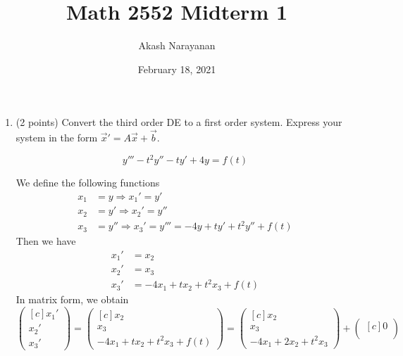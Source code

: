\documentclass[11pt, titlepage]{article}
\title{Math 2552 Midterm 1}
\author{Akash Narayanan}
\date{February 18, 2021}
\begin{document}
  \maketitle

  \begin{enumerate}
    \item (2 points) Convert the third order DE to a first order system.
    Express your system in the form \(\vec{x}' = A \vec{x} + \vec{b}\).

    \begin{equation*}
      y''' - t^{2}y'' - ty' + 4y = f(t)
    \end{equation*}

    \begin{solution}
      We define the following functions
      \begin{align*}
        x_{1} &= y   \Longrightarrow x_{1}' = y'  \\
        x_{2} &= y'  \Longrightarrow x_{2}' = y'' \\
        x_{3} &= y'' \Longrightarrow x_{3}' = y''' =
        -4y + ty' + t^{2} y'' + f(t)
      \end{align*}
      Then we have
      \begin{align*}
        x_{1}' &= x_{2} \\
        x_{2}' &= x_{3} \\
        x_{3}' &= -4x_{1} + tx_{2} + t^{2}x_{3} + f(t)
      \end{align*}
      In matrix form, we obtain
      \begin{equation*}
        \begin{pmatrix*}[c]
          x_{1}' \\
          x_{2}' \\
          x_{3}'
        \end{pmatrix*} =
        \begin{pmatrix*}[c]
          x_{2} \\
          x_{3} \\
          -4 x_{1} + t x_{2} + t^{2} x_{3} + f(t)
        \end{pmatrix*} =
        \begin{pmatrix*}[c]
          x_{2} \\
          x_{3} \\
          -4 x_{1} + 2 x_{2} + t^{2} x_{3}
        \end{pmatrix*} +
        \begin{pmatrix*}[c]
          0 \\

\end{pmatrix*}
\end{equation*}
\end{solution}
\end{enumerate}
\end{document}
